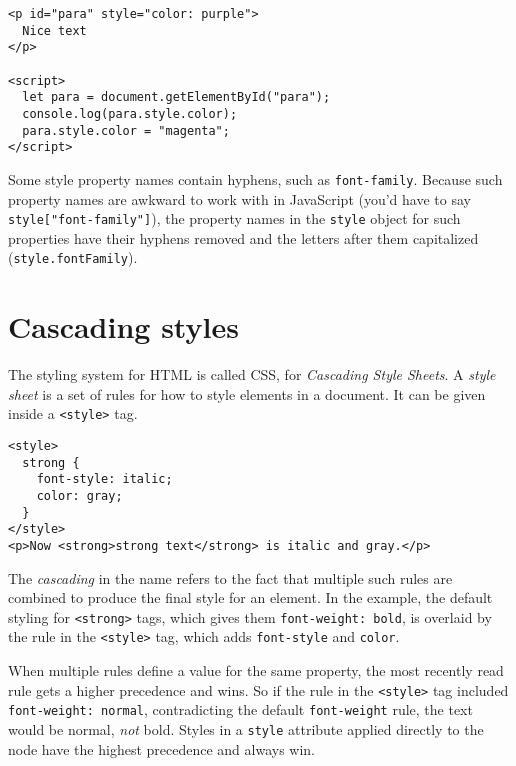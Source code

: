 \begin{lstlisting}
<p id="para" style="color: purple">
  Nice text
</p>

<script>
  let para = document.getElementById("para");
  console.log(para.style.color);
  para.style.color = "magenta";
</script>
\end{lstlisting}
\noindent{}

Some style property names contain hyphens, such as \lstinline`font-family`. Because such property names are awkward to work with in JavaScript (you'd have to say \lstinline`style["font-family"]`), the property names in the \lstinline`style` object for such properties have their hyphens removed and the letters after them capitalized (\lstinline`style.fontFamily`).

\section{Cascading styles}

The styling system for HTML is called CSS, for \emph{Cascading Style Sheets}. A \emph{style sheet} is a set of rules for how to style elements in a document. It can be given inside a \lstinline`<style>` tag.

\begin{lstlisting}
<style>
  strong {
    font-style: italic;
    color: gray;
  }
</style>
<p>Now <strong>strong text</strong> is italic and gray.</p>
\end{lstlisting}
\noindent{}

The \emph{cascading} in the name refers to the fact that multiple such rules are combined to produce the final style for an element. In the example, the default styling for \lstinline`<strong>` tags, which gives them \lstinline`font-weight: bold`, is overlaid by the rule in the \lstinline`<style>` tag, which adds \lstinline`font-style` and \lstinline`color`.

When multiple rules define a value for the same property, the most recently read rule gets a higher precedence and wins. So if the rule in the \lstinline`<style>` tag included \lstinline`font-weight: normal`, contradicting the default \lstinline`font-weight` rule, the text would be normal, \emph{not} bold. Styles in a \lstinline`style` attribute applied directly to the node have the highest precedence and always win.

